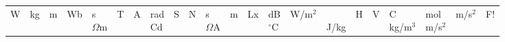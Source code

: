\documentclass[a6paper, 10pt, twoside]{article}
\begin{document}
\noindent
{}
\small
\begin{center}
\end{center}
\vspace{-10pt}
\begin{table}[!h]
\begin{lyrics}
\begin{tabularx}{0.85\textwidth}{X X X X X}
W&kg&m&Wb&s\physicalonly{\vspace{3pt} \\}
$\Omega$m&T&A&rad\physicalonly{\vspace{3pt} \\}
Cd&S&N&s\physicalonly{\vspace{3pt} \\}
$\Omega$A&m&Lx&dB\physicalonly{\vspace{3pt} \\}
$^{\circ}$C&W/m$^2$ &\physicalonly{\vspace{5pt} \\}
J/kg&H&V&C\physicalonly{\vspace{3pt} \\}
kg/m$^3$ & mol\physicalonly{\vspace{3pt} \\}
m/s$^2$&m/s$^2$&F!
\end{tabularx}
\end{lyrics}
\end{table}
\begin{center}
\end{center}
\end{document}
